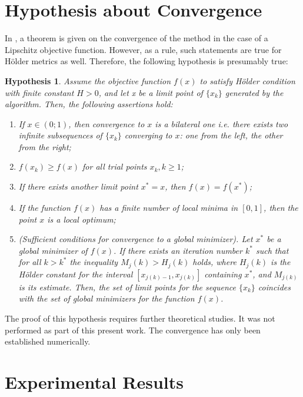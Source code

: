 \documentclass[procedia]{easychair}
\newtheorem{hypothesis}{Hypothesis}
\begin{document}
\section{Hypothesis about Convergence}
In \cite{sergLocalTuning}, a theorem is given on the convergence of the method in the
case of a Lipschitz objective function. However, as a rule, such statements are
true for Hölder metrics as well. Therefore, the following hypothesis is presumably true:

\begin{hypothesis}
Assume the objective function \(f(x)\) to  satisfy Hölder condition with finite
constant \(H > 0\), and let x be a limit point of \(\{x_k\}\) generated by the algorithm.
Then, the following assertions hold:
\begin{enumerate}
  \item If \(x\in(0;1)\), then convergence to \(x\) is a bilateral one i.e. there
  exists two infinite subsequences of \(\{x_k\}\) converging to \(x\): one from the
  left, the other from the right;
  \item \(f(x_k) \geqslant f(x)\) for all trial points \(x_k, k \geqslant 1\);
  \item If there exists another limit point \(x^* = x\), then \(f(x) = f(x^*)\);
  \item If the function \(f(x)\) has a finite number of local minima in \([0, 1]\),
  then the point \(x\) is a local optimum;
  \item (Sufficient conditions for convergence to a global minimizer). Let \(x^*\)
  be a global minimizer of \(f(x)\). If there exists an iteration number \(k^*\)
  such that for all \(k > k^*\) the inequality
  \(M_j(k) > H_j(k)\) holds, where \(H_j(k)\) is the Hölder constant for the interval
  \([x_{j(k)-1}, x_{j(k)}]\) containing \(x^*\), and \(M_{j(k)}\) is its estimate.
  Then, the set of limit points for the sequence \(\{x_k\}\) coincides with the set
  of global minimizers for the function \(f(x)\).
\end{enumerate}
\end{hypothesis}

The proof of this hypothesis requires further theoretical studies. It was not performed
as part of this present work. The convergence has only been established numerically.

\section{Experimental Results}
\label{sect:experiments}
\end{document}
